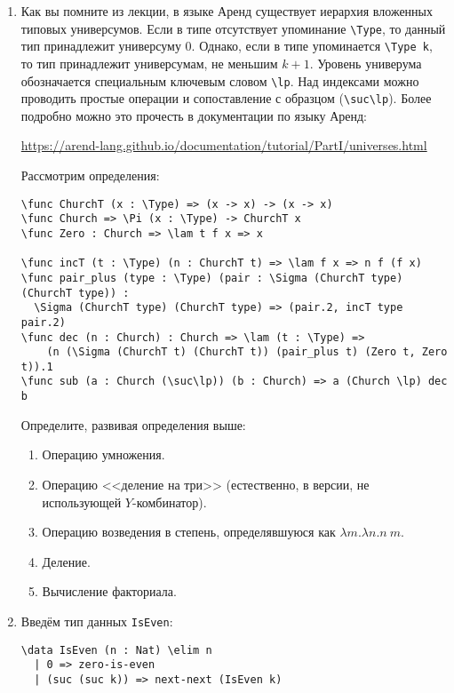 \documentclass[10pt,a4paper,oneside]{article}
\begin{document}
\begin{enumerate}
\item Как вы помните из лекции, в языке Аренд существует иерархия вложенных типовых универсумов. Если в типе отсутствует
упоминание \verb!\Type!, то данный тип принадлежит универсуму 0. Однако, если в типе упоминается \verb!\Type k!,
то тип принадлежит универсумам, не меньшим $k+1$. Уровень универума обозначается специальным ключевым словом \verb!\lp!.
Над индексами можно проводить простые операции и сопоставление с образцом (\verb!\suc\lp!). Более подробно
можно это прочесть в документации по языку Аренд:

\url{https://arend-lang.github.io/documentation/tutorial/PartI/universes.html}

Рассмотрим определения:
\begin{verbatim}
\func ChurchT (x : \Type) => (x -> x) -> (x -> x)
\func Church => \Pi (x : \Type) -> ChurchT x
\func Zero : Church => \lam t f x => x

\func incT (t : \Type) (n : ChurchT t) => \lam f x => n f (f x)
\func pair_plus (type : \Type) (pair : \Sigma (ChurchT type) (ChurchT type)) :
  \Sigma (ChurchT type) (ChurchT type) => (pair.2, incT type pair.2)
\func dec (n : Church) : Church => \lam (t : \Type) =>
    (n (\Sigma (ChurchT t) (ChurchT t)) (pair_plus t) (Zero t, Zero t)).1
\func sub (a : Church (\suc\lp)) (b : Church) => a (Church \lp) dec b
\end{verbatim}

Определите, развивая определения выше:
\begin{enumerate}
\item Операцию умножения.
\item Операцию <<деление на три>> (естественно, в версии, не использующей $Y$-комбинатор).
\item Операцию возведения в степень, определявшуюся как $\lambda m.\lambda n.n\ m$.
\item Деление.
\item Вычисление факториала.
\end{enumerate}


\item Введём тип данных \verb!IsEven!:

\begin{verbatim}
\data IsEven (n : Nat) \elim n
  | 0 => zero-is-even
  | (suc (suc k)) => next-next (IsEven k)
\end{verbatim}


\end{enumerate}
\end{document}
